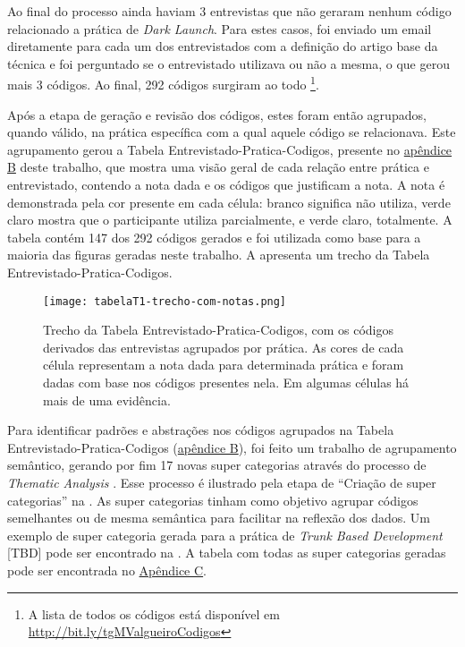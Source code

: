 Ao final do processo ainda haviam 3 entrevistas que não geraram nenhum código relacionado a prática de \emph{Dark Launch}. Para estes casos, foi enviado um email diretamente para cada um dos entrevistados com a definição do artigo base da técnica e foi perguntado se o entrevistado utilizava ou não a mesma, o que gerou mais 3 códigos. Ao final, 292 códigos surgiram ao todo \footnote{A lista de todos os códigos está disponível em \url{http://bit.ly/tgMValgueiroCodigos}}.

Após a etapa de geração e revisão dos códigos, estes foram então agrupados, quando válido, na prática específica com a qual aquele código se relacionava. Este agrupamento gerou a Tabela Entrevistado-Pratica-Codigos, presente no \hyperlink{tabela1}{apêndice B} deste trabalho, que mostra uma visão geral de cada relação entre prática e entrevistado, contendo a nota dada e os códigos que justificam a nota. A nota é demonstrada pela cor presente em cada célula: branco significa não utiliza, verde claro mostra que o participante utiliza parcialmente, e verde claro, totalmente. A tabela contém 147 dos 292 códigos gerados e foi utilizada como base para a maioria das figuras geradas neste trabalho. A  apresenta um trecho da Tabela Entrevistado-Pratica-Codigos.

\begin{figure}[ht]
    \begin{center}
    \texttt{[image: tabelaT1-trecho-com-notas.png]}
    \end{center}
    \caption[Trecho da Tabela Entrevistado-Pratica-Codigos]{
        Trecho da Tabela Entrevistado-Pratica-Codigos, com os códigos derivados das entrevistas agrupados por prática. As cores de cada célula representam a nota dada para determinada prática e foram dadas com base nos códigos presentes nela. Em algumas células há mais de uma evidência.
}\label{trecho_tabela_t1}
\end{figure}

Para identificar padrões e abstrações nos códigos agrupados na Tabela Entrevistado-Pratica-Codigos (\hyperlink{tabela1}{apêndice B}), foi feito um trabalho de agrupamento semântico, gerando por fim 17 novas super categorias através do processo de \emph{Thematic Analysis} \cite{groundedTheory}. Esse processo é ilustrado pela etapa de ``Criação de super categorias'' na . As super categorias tinham como objetivo agrupar códigos semelhantes ou de mesma semântica para facilitar na reflexão dos dados. Um exemplo de super categoria gerada para a prática de \emph{Trunk Based Development} [TBD] pode ser encontrado na . A tabela com todas as super categorias geradas pode ser encontrada no \hyperlink{super_Categorias}{Apêndice C}.

